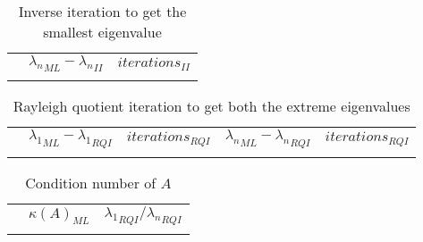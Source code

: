 \documentclass[a4paper,11pt]{article}
\begin{document}
\newcommand{\iimacro}[1] {
  \ensuremath{n=#1} & 
                    & 
                    \\ \cline{2-3}
}
\begin{table}[h]
  \centering
  \begin{tabular}{r|c|c|}
    \multicolumn{1}{r}{}
     & \multicolumn{1}{c}{${\lambda_n}_{ML}-{\lambda_n}_{II}$}
     & \multicolumn{1}{c}{$iterations_{II}$}\\
    \cline{2-3}
    \fornTen{\iimacro}
  \end{tabular}
  \caption{Inverse iteration to get the smallest eigenvalue}
  \label{tab:inverit}
\end{table}

\newcommand{\rqimacro}[1] {
  \ensuremath{n=#1} & 
                    & 
                    & 
                    & 
                    \\ \cline{2-5}
}
\begin{table}[h]
  \centering
  \begin{tabular}{r|c|c|c|c|}
    \multicolumn{1}{r}{}
     & \multicolumn{1}{c}{${\lambda_1}_{ML}-{\lambda_1}_{RQI}$}
     & \multicolumn{1}{c}{$iterations_{RQI}$}
     & \multicolumn{1}{c}{${\lambda_n}_{ML}-{\lambda_n}_{RQI}$}
     & \multicolumn{1}{c}{$iterations_{RQI}$}\\
    \cline{2-5}
    \fornTen{\rqimacro}
  \end{tabular}
  \caption{Rayleigh quotient iteration to get both the extreme eigenvalues}
  \label{tab:rqit}
\end{table}

\newcommand{\condamacro}[1] {
  \ensuremath{n=#1} & 
                    & 
                    \\ \cline{2-3}
}
\begin{table}[h]
  \centering
  \begin{tabular}{r|c|c|}
    \multicolumn{1}{r}{}
    & \multicolumn{1}{c}{$\kappa(A)_{ML}$}
     & \multicolumn{1}{c}{${\lambda_1}_{RQI}/{\lambda_n}_{RQI} $} \\
    \cline{2-3}
    \fornTen{\condamacro}
  \end{tabular}
  \caption{Condition number of $A$}
  \label{tab:conda}
\end{table}
\end{document}

